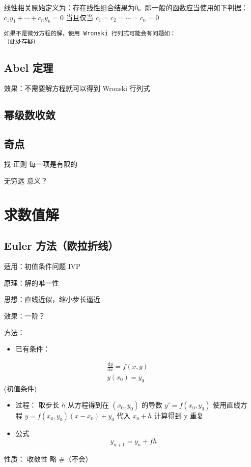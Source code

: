 \documentclass[11pt]{report}
\begin{document}
线性相关原始定义为：存在线性组合结果为0。即一般的函数应当使用如下判据：
\(c_1y_1+\cdots+c_ny_n=0\) 当且仅当 \(c_1=c_2=\cdots=c_n=0\) 

\begin{verbatim}
如果不是微分方程的解，使用 Wronski 行列式可能会有问题如：
（此处存疑）
\end{verbatim}

\chapter{Abel 定理}
\label{sec:org0562be1}
效果：不需要解方程就可以得到 Wronski 行列式

\chapter{幂级数收敛}
\label{sec:org5fa66db}

\chapter{奇点}
\label{sec:org0324b7d}
找
正则
每一项是有限的

无穷远
意义？

\part{求数值解}
\label{sec:orgfcd1aec}

\chapter{Euler 方法（欧拉折线）}
\label{sec:org6cc2eec}
适用：初值条件问题 IVP

原理：解的唯一性

思想：直线近似，缩小步长逼近

效果：一阶？

方法：

\begin{itemize}
\item 已有条件：
\end{itemize}
\begin{gather}
\label{eq:29}
\frac{\mathrm{d}y}{\mathrm{d}x}=f(x,y)\\
y(x_0)=y_0
\end{gather}
(初值条件)

\begin{itemize}
\item 过程：
取步长 \(h\)
从方程得到在 \((x_{0},y_0)\) 的导数 \(y'=f(x_0,y_0)\)
使用直线方程 \(y=f(x_0,y_0)(x-x_0)+y_0\)
代入 \(x_0+h\) 计算得到 y 重复

\item 公式
\begin{equation}
\label{eq:30}
y_{n+1}=y_n+fh
\end{equation}
\end{itemize}
性质：
收敛性
略
\#（不会）
\end{document}
